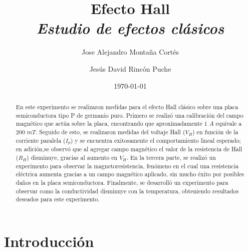 \documentclass[%
 reprint,
 amsmath,amssymb,
 aps,
]{revtex4-1}
\newcommand{\subtitle}[1]{%
\posttitle{%
    \par\end{center}
\begin{center}\large#1\end{center}
\vskip0.5em}%
}
\begin{document}

\title{Efecto Hall\\ \textit{Estudio de efectos clásicos} }%


\author{Jose Alejandro Montaña Cortés}
\author{Jesús David Rincón Puche}%
%


\date{\today}%

\begin{abstract}

En este experimento se realizaron medidas para el efecto Hall clásico sobre una placa semiconductora tipo P de germanio puro. Primero se realizó una calibración del campo magnético que actúa sobre la placa, encontrando que aproximadamente 1 $A$ equivale a 200 $mT$. Seguido de esto, se realizaron medidas del voltaje Hall ($V_H$) en función de la corriente paralela ($I_p$) y se encuentra exitosamente el comportamiento lineal esperado; en adición,se observó que al agregar campo magnético el valor de la resistencia de Hall ($R_H$) disminuye, gracias al aumento en $V_H$. En la tercera parte, se realizó un experimento para observar la magnetoresistencia, fenómeno en el cual una resistencia eléctrica aumenta gracias a un campo magnético aplicado, sin mucho éxito por posibles daños en la placa semiconductora. Finalmente, se desarrolló un experimento para observar como la conductividad disminuye con la temperatura, obteniendo resultados deseados para este experimento.

\end{abstract}
\maketitle

\section{Introducción}
\end{document}
